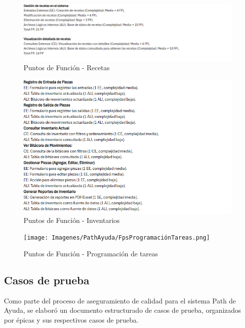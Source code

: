 \documentclass[12pt,letterpaper,spanish, xcolor=table]{report}
\numberwithin{figure}{subsection}
\begin{document}
	\begin{figure}[H]
		\centering
		\includegraphics[width=1.0\textwidth]
		{Imagenes/PathAyuda/FpsRecetas.png}
		\caption{Puntos de Función - Recetas
		}\label{a2}
	\end{figure}
	
	\begin{figure}[H]
		\centering
		\includegraphics[width=1.0\textwidth]
		{Imagenes/PathAyuda/FpsInventarios.png}
		\caption{Puntos de Función - Inventarios
		}\label{a2}
	\end{figure}
	
	\begin{figure}[H]
		\centering
		\texttt{[image: Imagenes/PathAyuda/FpsProgramaciónTareas.png]}
		\caption{Puntos de Función - Programación de tareas 
		}\label{a2}
	\end{figure}
\newpage

\subsection{Casos de prueba}

	Como parte del proceso de aseguramiento de calidad para el sistema Path de Ayuda, se elaboró un documento estructurado de casos de prueba, organizados por épicas y sus respectivos casos de prueba.\\
	
\end{document}
